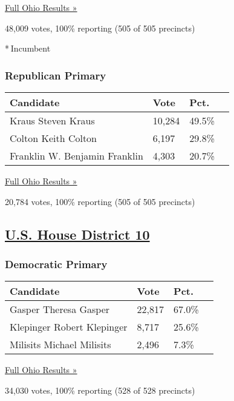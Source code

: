 \href{https://www.nytimes3xbfgragh.onion/elections/results/ohio}{Full
Ohio Results »}

48,009 votes, 100\% reporting (505 of 505 precincts)

* Incumbent

\hypertarget{republican-primary-10}{%
\subsubsection{Republican Primary}\label{republican-primary-10}}

\begin{longtable}[]{@{}llll@{}}
\toprule
Candidate & Vote & Pct. &\tabularnewline
\midrule
\endhead
 Kraus Steven Kraus & 10,284 & 49.5\% &\tabularnewline
 Colton Keith Colton & 6,197 & 29.8\% &\tabularnewline
 Franklin W. Benjamin Franklin & 4,303 & 20.7\% &\tabularnewline
\bottomrule
\end{longtable}

\href{https://www.nytimes3xbfgragh.onion/elections/results/ohio}{Full
Ohio Results »}

20,784 votes, 100\% reporting (505 of 505 precincts)

\hypertarget{us-house-district-10}{%
\subsection{\texorpdfstring{\href{https://www.nytimes3xbfgragh.onion/elections/results/ohio-house-district-10-primary-election}{U.S.
House District
10}}{U.S. House District 10}}\label{us-house-district-10}}

\hypertarget{democratic-primary-11}{%
\subsubsection{Democratic Primary}\label{democratic-primary-11}}

\begin{longtable}[]{@{}llll@{}}
\toprule
Candidate & Vote & Pct. &\tabularnewline
\midrule
\endhead
 Gasper Theresa Gasper & 22,817 & 67.0\% &\tabularnewline
 Klepinger Robert Klepinger & 8,717 & 25.6\% &\tabularnewline
 Milisits Michael Milisits & 2,496 & 7.3\% &\tabularnewline
\bottomrule
\end{longtable}

\href{https://www.nytimes3xbfgragh.onion/elections/results/ohio}{Full
Ohio Results »}

34,030 votes, 100\% reporting (528 of 528 precincts)

